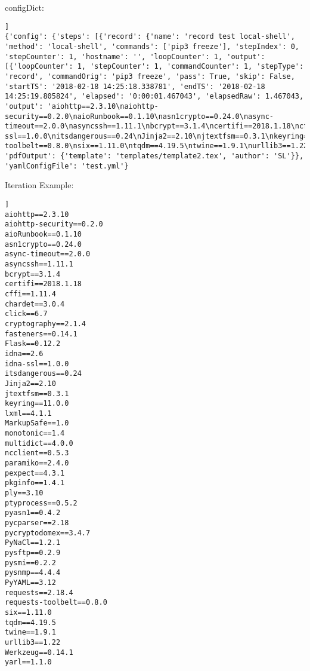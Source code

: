 \documentclass[10pt,a4paper]{article}
\begin{document}
configDict:

\begin{lstlisting}[]]
{'config': {'steps': [{'record': {'name': 'record test local-shell', 'method': 'local-shell', 'commands': ['pip3 freeze'], 'stepIndex': 0, 'stepCounter': 1, 'hostname': '', 'loopCounter': 1, 'output': [{'loopCounter': 1, 'stepCounter': 1, 'commandCounter': 1, 'stepType': 'record', 'commandOrig': 'pip3 freeze', 'pass': True, 'skip': False, 'startTS': '2018-02-18 14:25:18.338781', 'endTS': '2018-02-18 14:25:19.805824', 'elapsed': '0:00:01.467043', 'elapsedRaw': 1.467043, 'output': 'aiohttp==2.3.10\naiohttp-security==0.2.0\naioRunbook==0.1.10\nasn1crypto==0.24.0\nasync-timeout==2.0.0\nasyncssh==1.11.1\nbcrypt==3.1.4\ncertifi==2018.1.18\ncffi==1.11.4\nchardet==3.0.4\nclick==6.7\ncryptography==2.1.4\nfasteners==0.14.1\nFlask==0.12.2\nidna==2.6\nidna-ssl==1.0.0\nitsdangerous==0.24\nJinja2==2.10\njtextfsm==0.3.1\nkeyring==11.0.0\nlxml==4.1.1\nMarkupSafe==1.0\nmonotonic==1.4\nmultidict==4.0.0\nncclient==0.5.3\nparamiko==2.4.0\npexpect==4.3.1\npkginfo==1.4.1\nply==3.10\nptyprocess==0.5.2\npyasn1==0.4.2\npycparser==2.18\npycryptodomex==3.4.7\nPyNaCl==1.2.1\npysftp==0.2.9\npysmi==0.2.2\npysnmp==4.4.4\nPyYAML==3.12\nrequests==2.18.4\nrequests-toolbelt==0.8.0\nsix==1.11.0\ntqdm==4.19.5\ntwine==1.9.1\nurllib3==1.22\nWerkzeug==0.14.1\nyarl==1.1.0'}]}}], 'pdfOutput': {'template': 'templates/template2.tex', 'author': 'SL'}}, 'yamlConfigFile': 'test.yml'}
\end{lstlisting}



Iteration Example:

      \begin{lstlisting}[]]
aiohttp==2.3.10
aiohttp-security==0.2.0
aioRunbook==0.1.10
asn1crypto==0.24.0
async-timeout==2.0.0
asyncssh==1.11.1
bcrypt==3.1.4
certifi==2018.1.18
cffi==1.11.4
chardet==3.0.4
click==6.7
cryptography==2.1.4
fasteners==0.14.1
Flask==0.12.2
idna==2.6
idna-ssl==1.0.0
itsdangerous==0.24
Jinja2==2.10
jtextfsm==0.3.1
keyring==11.0.0
lxml==4.1.1
MarkupSafe==1.0
monotonic==1.4
multidict==4.0.0
ncclient==0.5.3
paramiko==2.4.0
pexpect==4.3.1
pkginfo==1.4.1
ply==3.10
ptyprocess==0.5.2
pyasn1==0.4.2
pycparser==2.18
pycryptodomex==3.4.7
PyNaCl==1.2.1
pysftp==0.2.9
pysmi==0.2.2
pysnmp==4.4.4
PyYAML==3.12
requests==2.18.4
requests-toolbelt==0.8.0
six==1.11.0
tqdm==4.19.5
twine==1.9.1
urllib3==1.22
Werkzeug==0.14.1
yarl==1.1.0
\end{lstlisting}
      
\end{document}
